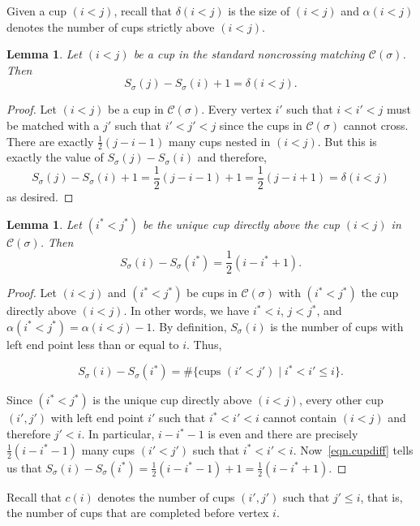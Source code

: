 \documentclass[11pt]{amsart}
\newtheorem{lemma}[theorem]{Lemma}
\theoremstyle{remark}
\theoremstyle{remark}
\theoremstyle{definition}
\theoremstyle{definition}
\theoremstyle{definition}
\numberwithin{equation}{section}
\newcommand{\ga}{\alpha}
\newcommand{\gd}{\delta}
\newcommand{\gs}{\sigma}
\newcommand{\cc}{\mathcal{C}}
\newcommand{\al}{\alpha}
\newcommand{\cupsigma}{\cc(\gs)}
\begin{document}
Given a cup $(i<j)$, recall that $\delta(i<j)$ is the size of $(i<j)$ and $\al(i<j)$ denotes the number of cups strictly above $(i<j)$. 

\begin{lemma}\label{lem.length}  Let $(i<j)$ be a cup in the standard noncrossing matching $\cupsigma$. Then 
\[
S_\gs(j)-S_\gs(i)+1 = \delta(i<j)  .
\]
\end{lemma}
\begin{proof} Let $(i<j)$ be a cup in $\cupsigma$. Every vertex $i'$ such that $i<i'<j$ must be matched with a $j'$ such that $i'<j'<j$ since the cups in $\cupsigma$ cannot cross. There are exactly $\frac{1}{2}(j-i-1)$ many cups nested in $(i<j)$. But this is exactly the value of $S_\gs(j)-S_\gs(i)$ and therefore,
\begin{equation*}
    S_\gs(j)-S_\gs(i)+1 =\frac{1}{2}(j-i-1)+1 = \frac{1}{2}(j-i+1)=\gd(i<j)
\end{equation*}
as desired.
\end{proof}

\begin{lemma}\label{lem.Sdiff}
Let $(i^*<j^*)$ be the unique cup directly above the cup $(i<j)$ in $\cupsigma$. Then
\[
S_\gs(i)-S_\gs(i^*)=\frac{1}{2} \left(i-i^*+1\right).
\]
\end{lemma}
\begin{proof}
Let $(i<j)$ and $(i^*<j^*)$ be cups in $\cupsigma$ with $(i^*<j^*)$ the cup directly above $(i<j)$. In other words, we have $i^*<i$, $j<j^*$, and $\ga(i^*<j^*)=\ga(i<j)-1$. By definition, $S_\gs(i)$ is the number of cups with left end point less than or equal to $i$. Thus, 

\begin{equation}\label{eqn.cupdiff}
S_\gs(i)-S_\gs(i^*)   = \#\{\text{cups } (i'<j')\mid i^*< i'\leq i\}.
\end{equation}

Since $(i^*<j^*)$ is the unique cup directly above $(i<j)$, every other cup $(i',j')$ with left end point $i'$ such that $i^*<i'<i$ cannot contain $(i<j)$ and therefore $j'<i$. In particular, $i-i^*-1$ is even and there are precisely $\frac{1}{2}(i-i^*-1)$ many cups $(i'<j')$ such that $i^*<i'<i$. Now~\eqref{eqn.cupdiff} tells us that $S_\gs(i)-S_\gs(i^*) = \frac{1}{2}(i-i^*-1) + 1 = \frac{1}{2}(i-i^*+1)$.
\end{proof}




Recall that $c(i)$ denotes the number of cups $(i',j')$ such that $j'\leq i$, that is, the number of cups that are completed before vertex $i$. 
\end{document}
